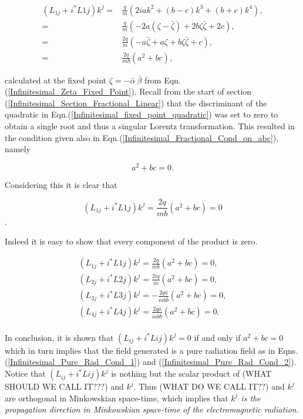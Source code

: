 \begin{align*}
(L_{1j} + i ^*L{1j}) k^j = & \frac{q}{m} (2iak^2 + (b-c)k^3 + (b+c)k^4), \\
                         = &\frac{q}{m} (-2a(\zeta - \bar{\zeta}) + 2b\zeta\bar{\zeta} + 2c), \\
                         = &\frac{2q}{m} (-a\bar{\zeta} + a\zeta + b\zeta\bar{\zeta} +c), \\
                         = &\frac{2q}{mb} (a^2 + bc), 
\end{align*}

\noindent calculated at the fixed point $\zeta = - \bar{\alpha} \ {\bar{\beta}}$ from Eqn.(\ref{Infinitesimal_Zeta_Fixed_Point}). Recall from the start of section (\ref{Infinitesimal_Section_Fractional_Linear}) that the discriminant of the quadratic in Eqn.(\ref{Infinitesimal_fixed_point_quadratic}) was set to zero to obtain a single root and thus a singular Lorentz transformation. This resulted in the condition given also in Eqn.(\ref{Infinitesimal_Fractional_Cond_on_abc}), namely

\begin{equation*}   
a^2 + bc = 0.
\end{equation*}

\noindent Considering this it is clear that 

$$(L_{1j} + i ^*L{1j}) k^j  = \frac{2q}{mb} (a^2 + bc) = 0$$.

\noindent Indeed it is easy to show that every component of the product is zero.

\begin{gather*}
(L_{1j} + i ^*L{1j}) k^j  = \frac{2q}{mb} (a^2 + bc) = 0, \\
(L_{2j} + i ^*L{2j}) k^j  = \frac{2iq}{m} (a^2 + bc) = 0, \\
(L_{3j} + i ^*L{3j}) k^j  = -\frac{2q\bar{a}}{mb\bar{b}} (a^2 + bc) = 0, \\
(L_{4j} + i ^*L{4j}) k^j  = \frac{2q\bar{a}}{mb\bar{b}} (a^2 + bc) = 0. \\
\end{gather*}

In conclusion, it is shown that $(L_{ij} + i ^*L{ij}) k^j = 0$ if and only if $a^2 + bc = 0$ which in turn implies that the field generated is a pure radiation field as in Eqns.(\ref{Infinitesimal_Pure_Rad_Cond_1}) and (\ref{Infinitesimal_Pure_Rad_Cond_2}). Notice that $(L_{ij} + i ^*L{ij}) k^j$ is nothing but the scalar product of (WHAT SHOULD WE CALL IT???) and $k^j$. Thus (WHAT DO WE CALL IT??) and $k^j$ are orthogonal in Minkowskian space-time, which implies that \textit{$k^j$ is the propagation direction in Minkowskian space-time of the electromagnetic radiation.}

